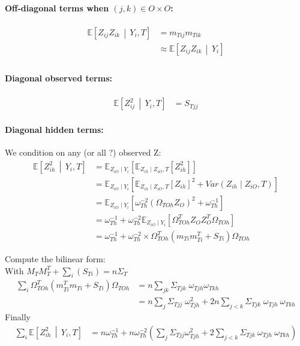 \documentclass[11pt,a4paper]{article}
\newcommand{\Esp}{\mathds{E}}
\begin{document}
\paragraph{Off-diagonal terms  when $(j,k)\in O\times O$:}
\begin{align*}
\Esp\left[ Z_{ij} Z_{ik} \,\middle\vert\,  Y_i,T \right] &=  m_{Tij}m_{Tik}\\
& \approx\Esp\left[Z_{ij} Z_{ik}  \,\middle\vert\,  Y_i\right]\\
\end{align*}
\paragraph{Diagonal observed terms:}
\begin{align*}
\Esp\left[ Z_{ij}^2 \,\middle\vert\,  Y_i,T \right] &= S_{Tjj}
\end{align*}
\paragraph{Diagonal hidden terms:\\}
We condition on any (or all ?) observed Z:
 \begin{align*}
\Esp\left[ Z_{ih}^2 \,\middle\vert\,  Y_i,T \right] & = \Esp_{Z_{iO}\mid Y_i}\left[ \Esp_{Z_{ih}\mid  Z_{iO},T}[Z_{ih}^2]\right]\\
&= \Esp_{Z_{iO}\mid Y_i}\left[ \Esp_{Z_{ih}\mid  Z_{iO},T}[Z_{ih}]^2 + Var(Z_{ih} \mid Z_{iO}, T)\right]\\
&= \Esp_{Z_{iO}\mid Y_i}\left[ \omega_{Th}^{-2}(\Omega_{TOh}Z_{O})^2 + \omega_{Th}^{-1}\right]\\
&= \omega_{Th}^{-1}+\omega_{Th}^{-2}\Esp_{Z_{iO}\mid Y_i}\left[ \Omega_{TOh}^TZ_{O}Z_{O}^T\Omega_{TOh} \right]\\
&= \omega_{Th}^{-1}+\omega_{Th}^{-2} \times\Omega_{TOh}^T(m_{Ti}m_{Ti}^T+S_{Ti})\Omega_{TOh}
\end{align*}

Compute the bilinear form:\\
With $M_TM_T^T+ \sum_i(S_{Ti}) = n\Sigma_T$
\begin{align*}
\sum_i\Omega_{TOh}^T (m_{Ti}^Tm_{Ti}+S_{Ti})\Omega_{TOh} &= n\sum_{jk}\Sigma_{Tjk} \;\omega_{Tjh}\omega_{Tkh}\\
&=n \sum_j \Sigma_{Tjj} \; \omega_{Tjh}^2 +2n\sum_{j < k} \Sigma_{Tjk} \; \omega_{Tjh} \: \omega_{Tkh}
\end{align*}
 Finally 
 \begin{align*}
 \sum_i\Esp\left[ Z_{ih}^2 \,\middle\vert\,  Y_i,T \right] &= n\omega_{Th}^{-1}+n\omega_{Th}^{-2} \left( \sum_j \Sigma_{Tjj} \omega_{Tjh}^2 +2\sum_{j < k} \Sigma_{Tjk} \: \omega_{Tjh} \: \omega_{Tkh}\right)
 \end{align*}
 
\end{document}
